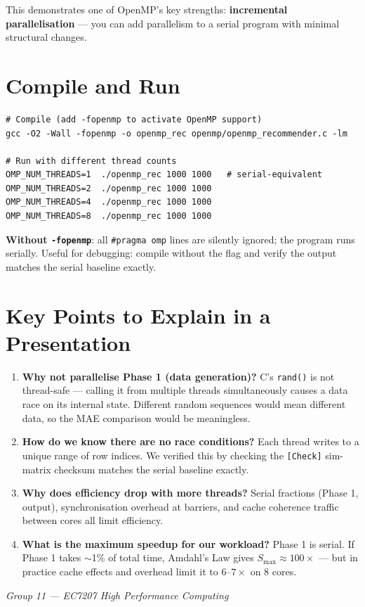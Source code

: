 \documentclass[12pt,a4paper]{article}
\begin{document}
This demonstrates one of OpenMP's key strengths: \textbf{incremental
parallelisation} — you can add parallelism to a serial program with minimal
structural changes.

\section{Compile and Run}

\begin{verbatim}
# Compile (add -fopenmp to activate OpenMP support)
gcc -O2 -Wall -fopenmp -o openmp_rec openmp/openmp_recommender.c -lm

# Run with different thread counts
OMP_NUM_THREADS=1  ./openmp_rec 1000 1000   # serial-equivalent
OMP_NUM_THREADS=2  ./openmp_rec 1000 1000
OMP_NUM_THREADS=4  ./openmp_rec 1000 1000
OMP_NUM_THREADS=8  ./openmp_rec 1000 1000
\end{verbatim}

\textbf{Without \texttt{-fopenmp}}: all \texttt{\#pragma omp} lines are
silently ignored; the program runs serially.  Useful for debugging: compile
without the flag and verify the output matches the serial baseline exactly.

\section{Key Points to Explain in a Presentation}

\begin{enumerate}
    \item \textbf{Why not parallelise Phase 1 (data generation)?}  C's
          \texttt{rand()} is not thread-safe — calling it from multiple threads
          simultaneously causes a data race on its internal state.  Different
          random sequences would mean different data, so the MAE comparison
          would be meaningless.
    \item \textbf{How do we know there are no race conditions?}  Each thread
          writes to a unique range of row indices.  We verified this by
          checking the \texttt{[Check]} sim-matrix checksum matches the serial
          baseline exactly.
    \item \textbf{Why does efficiency drop with more threads?}  Serial
          fractions (Phase 1, output), synchronisation overhead at barriers,
          and cache coherence traffic between cores all limit efficiency.
    \item \textbf{What is the maximum speedup for our workload?}  Phase 1
          is serial.  If Phase 1 takes $\sim$1\% of total time, Amdahl's Law
          gives $S_{\max} \approx 100\times$ — but in practice cache effects
          and overhead limit it to $6$--$7\times$ on 8 cores.
\end{enumerate}

\vfill
\begin{center}
    \small\textit{Group 11 — EC7207 High Performance Computing}
\end{center}
\end{document}
